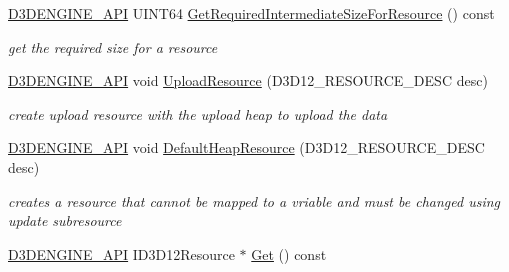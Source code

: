 \begin{DoxyCompactItemize}
\mbox{\hyperlink{stdafx_8h_a8ee2d990c5dfba7794dd2b60741d7722}{D3\+D\+E\+N\+G\+I\+N\+E\+\_\+\+A\+PI}} U\+I\+N\+T64 \mbox{\hyperlink{class_resource_manager_a6dd8fde1b39e245774f8a7120d7e3c99}{Get\+Required\+Intermediate\+Size\+For\+Resource}} () const
\begin{DoxyCompactList}\small\item\em get the required size for a resource \end{DoxyCompactList}\item 
\mbox{\hyperlink{stdafx_8h_a8ee2d990c5dfba7794dd2b60741d7722}{D3\+D\+E\+N\+G\+I\+N\+E\+\_\+\+A\+PI}} void \mbox{\hyperlink{class_resource_manager_abbcc9205898abeaad0a4a4a5ca23275c}{Upload\+Resource}} (D3\+D12\+\_\+\+R\+E\+S\+O\+U\+R\+C\+E\+\_\+\+D\+E\+SC desc)
\begin{DoxyCompactList}\small\item\em create upload resource with the upload heap to upload the data \end{DoxyCompactList}\item 
\mbox{\hyperlink{stdafx_8h_a8ee2d990c5dfba7794dd2b60741d7722}{D3\+D\+E\+N\+G\+I\+N\+E\+\_\+\+A\+PI}} void \mbox{\hyperlink{class_resource_manager_a9974fc877935a9b41e2416143fe8e72b}{Default\+Heap\+Resource}} (D3\+D12\+\_\+\+R\+E\+S\+O\+U\+R\+C\+E\+\_\+\+D\+E\+SC desc)
\begin{DoxyCompactList}\small\item\em creates a resource that cannot be mapped to a vriable and must be changed using update subresource \end{DoxyCompactList}\item 
\mbox{\hyperlink{stdafx_8h_a8ee2d990c5dfba7794dd2b60741d7722}{D3\+D\+E\+N\+G\+I\+N\+E\+\_\+\+A\+PI}} I\+D3\+D12\+Resource $\ast$ \mbox{\hyperlink{class_resource_manager_a0d93b29422a5f9eac0115254edb4327a}{Get}} () const
\end{DoxyCompactItemize}
